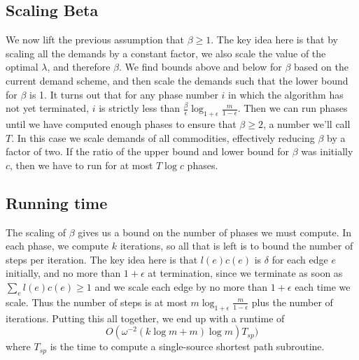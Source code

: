 \subsection{Scaling Beta}
We now lift the previous assumption that $\beta\geq 1$. The key idea
here is that by scaling all the demands by a constant factor, we also
scale the value of the optimal $\lambda$, and therefore $\beta$. We
find bounds above and below for $\beta$ based on the current demand
scheme, and then scale the demands such that the lower bound for
$\beta$ is 1. It turns out that for any phase number $i$ in which the
algorithm has not yet terminated, $i$ is strictly less than
$\frac{\beta}{\epsilon}\log_{1+\epsilon}\frac{m}{1-\epsilon}$. Then we
can run phases until we have computed enough
phases to ensure that $\beta\geq 2$, a number we'll call $T$. In this case
we scale demands of
all commodities, effectively reducing $\beta$ by a factor of
two. If the ratio of the upper bound and lower bound for $\beta$ was
initially $c$, then we have to run for at most $T\log c$ phases.
\subsection{Running time}
The scaling of $\beta$ gives us a bound on the number of phases we
must compute. In each phase, we compute $k$ iterations, so all that is
left is to bound the number of steps per iteration. The key idea here
is that $l(e)c(e)$ is $\delta$ for each edge $e$ initially, and no
more than $1+\epsilon$ at termination, since we terminate as soon as
$\sum_el(e)c(e)\geq 1$ and we scale each edge by no more than
$1+\epsilon$ each time we scale. Thus the number of steps is at most
$m\log_{1+\epsilon}\frac{m}{1-\epsilon}$ plus the number of
iterations. Putting this all together, we end up with a runtime of 
$$O(\omega^{-2}(k\log m+m)\log m)T_{sp})$$ where $T_{sp}$ is the time to
compute a single-source shortest path subroutine.



